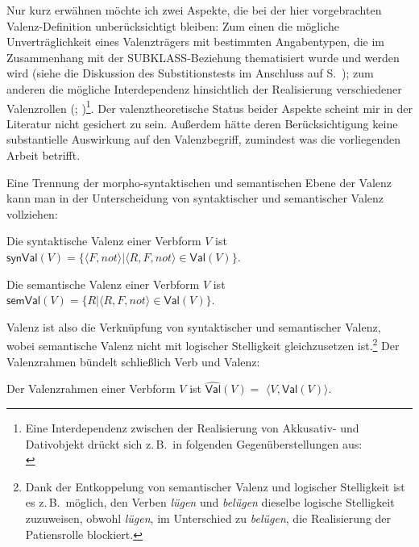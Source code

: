 Nur kurz erwähnen möchte ich zwei Aspekte, die bei der hier vorgebrachten Valenz-Defini\-tion unberücksichtigt bleiben: Zum einen die mögliche Unverträglichkeit eines Valenzträgers mit bestimmten Angabentypen, die im Zusammenhang mit der SUBKLASS-Bezie\-hung thematisiert wurde und werden wird (siehe die Diskussion des Substitionstests im Anschluss auf S.~\pageref{par-subsitutionstest}); zum anderen die mögliche Interdependenz hinsichtlich der Realisierung verschiedener Valenzrollen (\citealt[306ff]{Jacobs:94a}; \citealt[397f]{Jacobs:03})\footnote{Eine Interdependenz zwischen der Realisierung von Akkusativ- und Dativobjekt drückt sich z.\,B.\ in folgenden Gegenüberstellungen aus:\\
}. Der valenztheoretische Status beider Aspekte scheint mir in der Literatur nicht gesichert zu sein. Au\ss erdem hätte deren Berücksichtigung keine substantielle Auswirkung auf den Valenzbegriff, zumindest was die vorliegenden Arbeit betrifft.     

Eine Trennung der morpho-syntaktischen und semantischen Ebene der Valenz kann man in der Unterscheidung von syntaktischer und semantischer Valenz vollziehen:  
\begin{definition}
Die syntaktische Valenz einer Verbform $V$ ist \linebreak $\mathsf{synVal}(V) = \{\langle F,not \rangle | \langle R,F,not \rangle \in \mathsf{Val}(V) \}$.
\end{definition}
\begin{definition}
Die semantische Valenz einer Verbform $V$ ist \linebreak $\mathsf{semVal}(V) = \{R | \langle R,F,not \rangle \in \mathsf{Val}(V) \}$.
\end{definition}
Valenz ist also die Verknüpfung von syntaktischer und semantischer Valenz, wobei semantische Valenz nicht mit logischer Stelligkeit gleichzusetzen ist.\footnote{Dank der Entkoppelung von semantischer Valenz und logischer Stelligkeit ist es z.\,B.\ möglich, den Verben {\it lügen} und {\it belügen} dieselbe logische Stelligkeit zuzuweisen, obwohl {\it lügen}, im Unterschied zu {\it belügen}, die Realisierung der Patiensrolle blockiert.}  Der Valenzrahmen bündelt schlie\ss lich Verb und Valenz:
\begin{definition}[Valenzrahmen]
Der Valenzrahmen einer Verbform $V$ ist $\widehat{\mathsf{Val}}(V) =$ $\langle V, \mathsf{Val}(V) \rangle$.
\end{definition}

